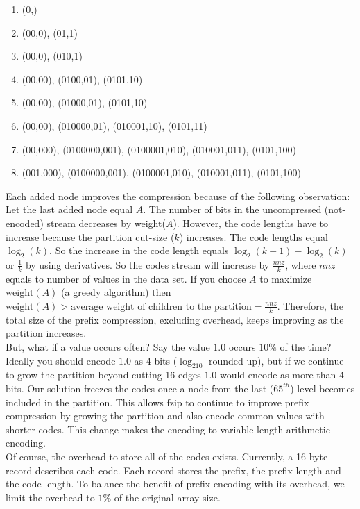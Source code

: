 \begin{enumerate}
    \item (0,)
    \item (00,0), (01,1)
    \item (00,0), (010,1)
    \item (00,00), (0100,01), (0101,10)
    \item (00,00), (01000,01), (0101,10)
    \item (00,00), (010000,01), (010001,10), (0101,11)
    \item (00,000), (0100000,001), (0100001,010), (010001,011), (0101,100)
    \item (001,000), (0100000,001), (0100001,010), (010001,011), (0101,100)
\end{enumerate} \par
Each added node improves the compression because of the following observation: Let the last added node equal $A$. The number of bits in the uncompressed (not-encoded) stream decreases by weight($A$). However, the code lengths have to increase because the partition cut-size ($k$) increases. The code lengths equal $\log_2(k)$. So the increase in the code length equals $\log_2(k+1)-\log_2(k)$ or $\frac{1}{k}$ by using derivatives. So the codes stream will increase by $\frac{nnz}{k}$, where $nnz$ equals to number of values in the data set. If you choose $A$ to maximize $\textrm{weight}(A)$ (a greedy algorithm) then $\textrm{weight}(A) > \textrm{average weight of children to the partition} = \frac{nnz}{k}$. Therefore, the total size of the prefix compression, excluding overhead, keeps improving as the partition increases.\\
\indent But, what if a value occurs often? Say the value $1.0$ occurs $10\%$ of the time? Ideally you should encode $1.0$ as 4 bits ($\log_210$ rounded up), but if we continue to grow the partition beyond cutting 16 edges $1.0$ would encode as more than 4 bits. Our solution freezes the codes once a node from the last ($65^{th}$) level becomes included in the partition. This allows fzip to continue to improve prefix compression by growing the partition and also encode common values with shorter codes. This change makes the encoding to variable-length arithmetic encoding.\\
\indent Of course, the overhead to store all of the codes exists. Currently, a 16 byte record describes each code. Each record stores the prefix, the prefix length and the code length. To balance the benefit of prefix encoding with its overhead, we limit the overhead to $1\%$ of the original array size.
